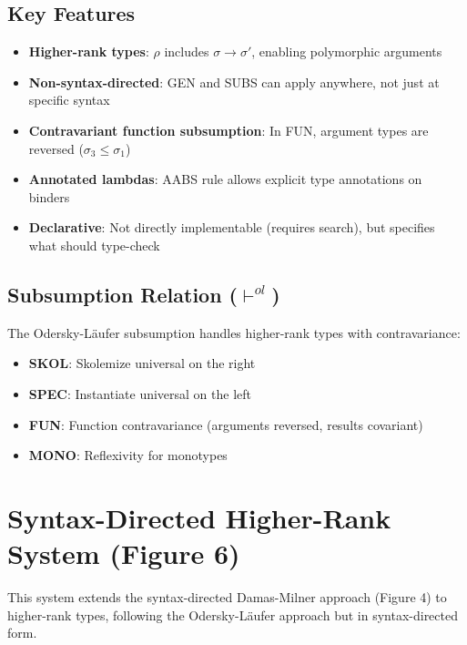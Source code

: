 \documentclass[11pt,a4paper]{article}
\begin{document}
\subsection{Key Features}

\begin{itemize}
\item \textbf{Higher-rank types}: $\rho$ includes $\sigma \to \sigma'$, enabling polymorphic arguments
\item \textbf{Non-syntax-directed}: GEN and SUBS can apply anywhere, not just at specific syntax
\item \textbf{Contravariant function subsumption}: In FUN, argument types are reversed ($\sigma_3 \le \sigma_1$)
\item \textbf{Annotated lambdas}: AABS rule allows explicit type annotations on binders
\item \textbf{Declarative}: Not directly implementable (requires search), but specifies what should type-check
\end{itemize}

\subsection{Subsumption Relation ($\vdash^{ol}$)}

The Odersky-Läufer subsumption handles higher-rank types with contravariance:
\begin{itemize}
\item \textbf{SKOL}: Skolemize universal on the right
\item \textbf{SPEC}: Instantiate universal on the left
\item \textbf{FUN}: Function contravariance (arguments reversed, results covariant)
\item \textbf{MONO}: Reflexivity for monotypes
\end{itemize}

\section{Syntax-Directed Higher-Rank System (Figure 6)}

This system extends the syntax-directed Damas-Milner approach (Figure 4) to higher-rank types, following the Odersky-Läufer approach but in syntax-directed form.
\end{document}
